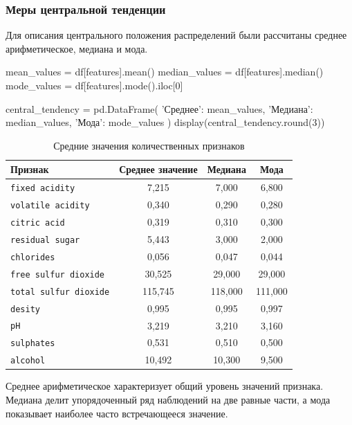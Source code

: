 \subsubsection*{Меры центральной тенденции}
 
Для описания центрального положения распределений были рассчитаны среднее арифметическое, медиана и мода.
 
\begin{Code}
mean_values = df[features].mean()
median_values = df[features].median()
mode_values = df[features].mode().iloc[0]

central_tendency = pd.DataFrame({
	'Среднее': mean_values,
	'Медиана': median_values,
	'Мода': mode_values
})
display(central_tendency.round(3))
\end{Code}

\begin{table}[ht]
	\centering
	\caption{Средние значения количественных признаков}
	\label{tab:means-wine}
	\begin{tabularx}{0.65\textwidth}{LCCC}
		\hline
		Признак & Среднее значение & Медиана & Мода \\
		\hline
		\texttt{fixed acidity} & 7{,}215 & 7{,}000 & 6{,}800\\
		\texttt{volatile acidity}  & 0{,}340 & 0{,}290 & 0{,}280\\
		\texttt{citric acid} & 0{,}319 & 0{,}310 & 0{,}300\\
		\texttt{residual sugar}  & 5{,}443 & 3{,}000 & 2{,}000\\
		\texttt{chlorides}  & 0{,}056 & 0{,}047 & 0{,}044\\
		\texttt{free sulfur dioxide}  & 30{,}525 & 29{,}000 & 29{,}000\\
		\texttt{total sulfur dioxide}  & 115{,}745 & 118{,}000 & 111{,}000\\
		\texttt{desity}  & 0{,}995 & 0{,}995 & 0{,}997\\
		\texttt{pH}  & 3{,}219 & 3{,}210 & 3{,}160\\
		\texttt{sulphates}  & 0{,}531 & 0{,}510 & 0{,}500\\
		\texttt{alcohol}  & 10{,}492 & 10{,}300 & 9{,}500\\
		\hline
	\end{tabularx}
\end{table}
\newpage
Среднее арифметическое характеризует общий уровень значений признака.
Медиана делит упорядоченный ряд наблюдений на две равные части, а мода
показывает наиболее часто встречающееся значение.
 
